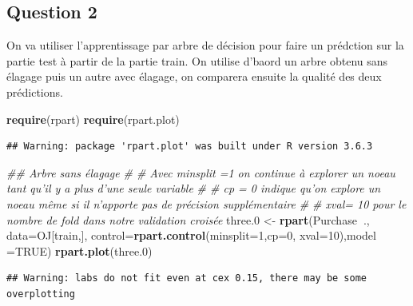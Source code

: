 \documentclass[]{article}
\newenvironment{Shaded}{\begin{snugshade}}{\end{snugshade}}
\newcommand{\CommentTok}[1]{\textcolor[rgb]{0.56,0.35,0.01}{\textit{#1}}}
\newcommand{\DataTypeTok}[1]{\textcolor[rgb]{0.13,0.29,0.53}{#1}}
\newcommand{\DecValTok}[1]{\textcolor[rgb]{0.00,0.00,0.81}{#1}}
\newcommand{\FloatTok}[1]{\textcolor[rgb]{0.00,0.00,0.81}{#1}}
\newcommand{\KeywordTok}[1]{\textcolor[rgb]{0.13,0.29,0.53}{\textbf{#1}}}
\newcommand{\NormalTok}[1]{#1}
\newcommand{\OperatorTok}[1]{\textcolor[rgb]{0.81,0.36,0.00}{\textbf{#1}}}
\newcommand{\OtherTok}[1]{\textcolor[rgb]{0.56,0.35,0.01}{#1}}
\newcommand{\StringTok}[1]{\textcolor[rgb]{0.31,0.60,0.02}{#1}}
\begin{document}
\hypertarget{question-2}{%
\subsection{Question 2}\label{question-2}}

On va utiliser l'apprentissage par arbre de décision pour faire un
prédction sur la partie test à partir de la partie train. On utilise
d'baord un arbre obtenu sans élagage puis un autre avec élagage, on
comparera ensuite la qualité des deux prédictions.

\begin{Shaded}
\begin{Highlighting}[]
\KeywordTok{require}\NormalTok{(rpart)}
\KeywordTok{require}\NormalTok{(rpart.plot)}
\end{Highlighting}
\end{Shaded}

\begin{verbatim}
## Warning: package 'rpart.plot' was built under R version 3.6.3
\end{verbatim}

\begin{Shaded}
\begin{Highlighting}[]
\CommentTok{## Arbre sans élagage}
\CommentTok{#   # Avec minsplit =1 on continue à explorer un noeau tant qu'il y a plus d'une seule variable }
\CommentTok{#   # cp = 0 indique qu'on explore un noeau même si il n'apporte pas de précision supplémentaire }
\CommentTok{#   # xval= 10 pour le nombre de fold dans notre validation croisée}
\NormalTok{three}\FloatTok{.0}\NormalTok{ <-}\StringTok{ }\KeywordTok{rpart}\NormalTok{(Purchase}\OperatorTok{~}\NormalTok{.,}
                \DataTypeTok{data=}\NormalTok{OJ[train,], }
                \DataTypeTok{control=}\KeywordTok{rpart.control}\NormalTok{(}\DataTypeTok{minsplit=}\DecValTok{1}\NormalTok{,}\DataTypeTok{cp=}\DecValTok{0}\NormalTok{, }\DataTypeTok{xval=}\DecValTok{10}\NormalTok{),}\DataTypeTok{model =}\OtherTok{TRUE}\NormalTok{)}
\KeywordTok{rpart.plot}\NormalTok{(three}\FloatTok{.0}\NormalTok{)}
\end{Highlighting}
\end{Shaded}

\begin{verbatim}
## Warning: labs do not fit even at cex 0.15, there may be some overplotting
\end{verbatim}
\end{document}
